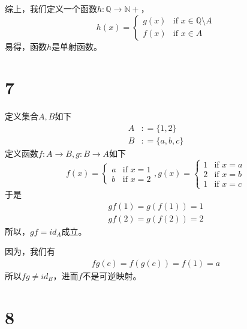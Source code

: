 \documentclass{article}
\begin{document}
综上，我们定义一个函数$h : \mathbb{Q} \to \mathbb{N}+$，
\begin{equation*}
      h(x) = \begin{cases}
            g(x) & \text{if } x \in \mathbb{Q} \setminus A \\
            f(x) & \text{if } x \in A
      \end{cases}
\end{equation*}
易得，函数$h$是单射函数。

\section*{7}

定义集合$A,B$如下
\begin{align*}
      A & : = \{1, 2\}    \\
      B & : = \{a, b, c\}
\end{align*}
定义函数$f: A \to B, g: B \to A$如下
\begin{equation*}
      f(x) = \begin{cases}
            a & \text{if } x = 1 \\
            b & \text{if } x = 2
      \end{cases},
      g(x) = \begin{cases}
            1 & \text{if } x = a \\
            2 & \text{if } x = b \\
            1 & \text{if } x = c
      \end{cases}
\end{equation*}
于是
\begin{align*}
      gf(1) = g(f(1)) = 1 \\
      gf(2) = g(f(2)) = 2
\end{align*}
所以，$gf = id_A$成立。

因为，我们有
\begin{align*}
      fg(c) = f(g(c)) = f(1) = a
\end{align*}
所以$fg \neq id_B$，进而$f$不是可逆映射。

\section*{8}
\end{document}
